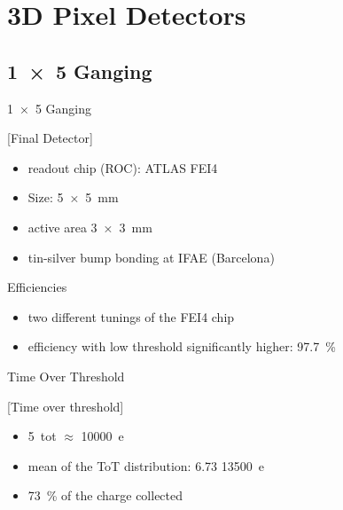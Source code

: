 \section{3D Pixel Detectors}
\subsection{\SI{1x5}{} Ganging}
\begin{frame}{\SI{1x5}{} Ganging}

	[Final Detector]	
	
	\begin{itemize}\itemfill
		\item readout chip (ROC): ATLAS FEI4
		\item Size: \SI{5x5}{\milli\meter}
		\item active area \SI{3x3}{\milli\meter}
		\item tin-silver bump bonding at IFAE (Barcelona)
	\end{itemize}
	
\end{frame}
\begin{frame}{Efficiencies}

	
	\begin{itemize}\itemfill
		\item two different tunings of the FEI4 chip
		\item efficiency with low threshold significantly higher: \SI{97.7}{\%}
	\end{itemize}
	
\end{frame}
\begin{frame}{Time Over Threshold}

	[Time over threshold]	
	
	\begin{itemize}\itemfill
		\item \SI{5}{tot} $\approx$ \SI{10000}{e}
		\item mean of the ToT distribution: 6.73 \ra \SI{13500}{e}
		\item \SI{73}{\%} of the charge collected
	\end{itemize}
	
\end{frame}
